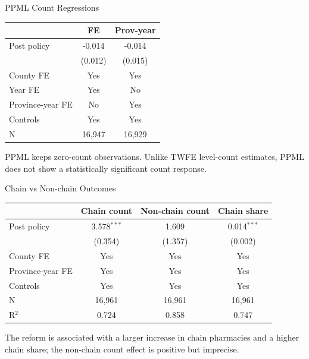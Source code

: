 \documentclass{beamer}
\begin{document}
\begin{frame}{PPML Count Regressions}

\centering
\scriptsize
\setlength{\tabcolsep}{7pt}

\begin{tabular}{lcc}
\toprule
& FE & Prov-year \\
\midrule
Post policy
& -0.014 & -0.014 \\
& (0.012) & (0.015) \\
\midrule
County FE & Yes & Yes \\
Year FE & Yes & No \\
Province-year FE & No & Yes \\
Controls & Yes & Yes \\
\midrule
N & 16,947 & 16,929 \\
\bottomrule
\end{tabular}

\vspace{0.6em}
\raggedright
\tiny PPML keeps zero-count observations. Unlike TWFE level-count estimates, PPML does not show a statistically significant count response.

\end{frame}

\begin{frame}{Chain vs Non-chain Outcomes}

\centering
\scriptsize
\setlength{\tabcolsep}{6pt}

\begin{tabular}{lccc}
\toprule
& Chain count & Non-chain count & Chain share \\
\midrule
Post policy
& 3.578$^{***}$ & 1.609 & 0.014$^{***}$ \\
& (0.354) & (1.357) & (0.002) \\
\midrule
County FE & Yes & Yes & Yes \\
Province-year FE & Yes & Yes & Yes \\
Controls & Yes & Yes & Yes \\
\midrule
N & 16,961 & 16,961 & 16,961 \\
R$^2$ & 0.724 & 0.858 & 0.747 \\
\bottomrule
\end{tabular}

\vspace{0.6em}
\raggedright
\tiny The reform is associated with a larger increase in chain pharmacies and a higher chain share; the non-chain count effect is positive but imprecise.

\end{frame}
\end{document}
